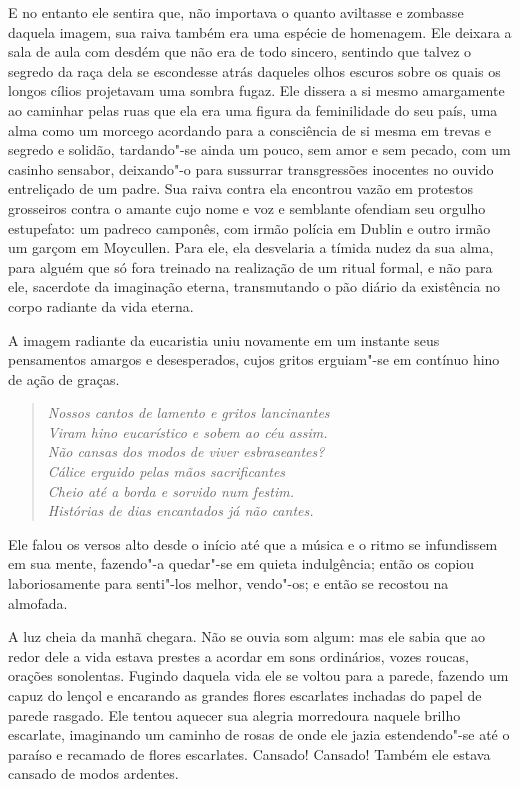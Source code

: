 E no entanto ele sentira
que, não importava o quanto aviltasse e zombasse daquela imagem, sua
raiva também era uma espécie de homenagem. Ele deixara a sala de aula
com desdém que não era de todo sincero, sentindo que talvez o segredo
da raça dela se escondesse atrás daqueles olhos escuros sobre os quais
os longos cílios projetavam uma sombra fugaz. Ele dissera a si mesmo
amargamente ao caminhar pelas ruas que ela era uma figura da
feminilidade do seu país, uma alma como um morcego acordando para a
consciência de si mesma em trevas e segredo e solidão, tardando"-se
ainda um pouco, sem amor e sem pecado, com um casinho sensabor,
deixando"-o para sussurrar transgressões inocentes no ouvido entreliçado
de um padre. Sua raiva contra ela encontrou vazão em protestos
grosseiros contra o amante cujo nome e voz e semblante ofendiam seu
orgulho estupefato: um padreco camponês, com irmão polícia em Dublin e
outro irmão um garçom em Moycullen. Para ele, ela desvelaria a tímida
nudez da sua alma, para alguém que só fora treinado na realização de um
ritual formal, e não para ele, sacerdote da imaginação eterna,
transmutando o pão diário da existência no corpo radiante da vida
eterna.

A imagem radiante da eucaristia uniu novamente em um instante seus
pensamentos amargos e desesperados, cujos gritos erguiam"-se em contínuo
hino de ação de graças.

\begin{verse}\itshape
Nossos cantos de lamento e gritos lancinantes\\
Viram hino eucarístico e sobem ao céu assim.\\
Não cansas dos modos de viver esbraseantes?\\
Cálice erguido pelas mãos sacrificantes\\
Cheio até a borda e sorvido num festim.\\
Histórias de dias encantados já não cantes.
\end{verse}

Ele falou os versos alto desde o início até que a música e o ritmo se
infundissem em sua mente, fazendo"-a quedar"-se em quieta indulgência;
então os copiou laboriosamente para senti"-los melhor, vendo"-os; e então
se recostou na almofada.

A luz cheia da manhã chegara. Não se ouvia som algum: mas ele sabia que
ao redor dele a vida estava prestes a acordar em sons ordinários,
vozes roucas, orações sonolentas. Fugindo daquela vida ele se voltou
para a parede, fazendo um capuz do lençol e encarando as grandes flores
escarlates inchadas do papel de parede rasgado. Ele tentou aquecer sua
alegria morredoura naquele brilho escarlate, imaginando um caminho de
rosas de onde ele jazia estendendo"-se até o paraíso e recamado de
flores escarlates. Cansado! Cansado! Também ele estava cansado de modos
ardentes.


